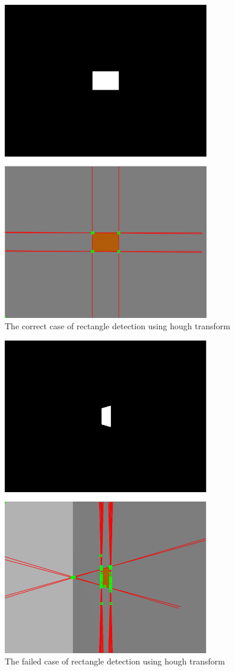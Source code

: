 \documentclass[master,korean,final]{cbnu-ecs}
\begin{document}
\begin{figure}[!ht]
  \centering
	\includegraphics[width=340px]{img/rect_hough01.png}
  \caption{The correct case of rectangle detection using hough transform}
\label{rect_hough01}
\end{figure}
\begin{figure}[!ht]
  \centering
	\includegraphics[width=340px]{img/rect_hough02.png}
  \caption{The failed case of rectangle detection using hough transform}
\label{rect_hough02}
\end{figure}
\end{document}
